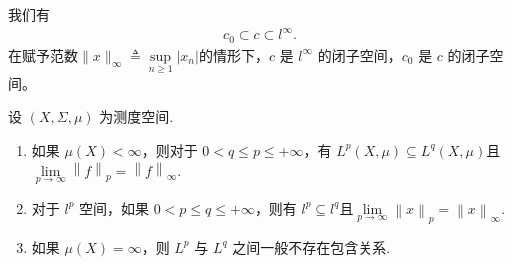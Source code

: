 \documentclass[../../main.tex]{subfiles}%
\begin{document}
\begin{proposition}
我们有
\begin{align*}
c_0 \subset c \subset l^{\infty}.
\end{align*}
在赋予范数\(\|x\|_{\infty} \triangleq \sup\limits_{n \geqslant 1} |x_n|\)的情形下，\(c\) 是 \(l^{\infty}\) 的闭子空间，\(c_0\) 是 \(c\) 的闭子空间。
\end{proposition}

\begin{proposition}
设 \((X, \Sigma, \mu)\) 为测度空间.
\begin{enumerate}[(1)]
\item 如果 \(\mu(X) < \infty\)，则对于 \(0 < q \leqslant p \leqslant +\infty\)，有 \(L^p(X, \mu) \subseteq L^q(X, \mu)\)且$\underset{p\rightarrow \infty}{\lim}\left\| f \right\| _p=\left\| f \right\| _{\infty}.$

\item 对于 \(l^p\) 空间，如果 \(0 < p \leqslant q \leqslant +\infty\)，则有 \(l^p \subseteq l^q\)且$\underset{p\rightarrow \infty}{\lim}\left\| x \right\| _p=\left\| x \right\| _{\infty}.$

\item 如果 \(\mu(X) = \infty\)，则 \(L^p\) 与 \(L^q\) 之间一般不存在包含关系.
\end{enumerate}
\end{proposition}
\end{document}
